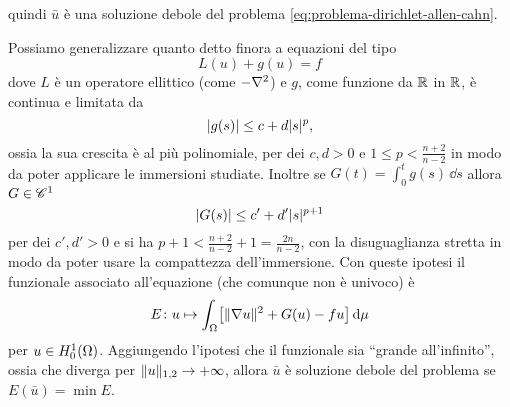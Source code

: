 quindi $\bar{u}$ è una soluzione debole del problema \eqref{eq:problema-dirichlet-allen-cahn}.

Possiamo generalizzare quanto detto finora a equazioni del tipo
\begin{equation}
    L(u)+g(u)=f
\end{equation}
dove $L$ è un operatore ellittico (come $-\lap$) e $g$, come funzione da $\R$ in $\R$, è continua e limitata da
\begin{equation}
    \abs{g(s)}\le c+d\abs{s}^p,
\end{equation}
ossia la sua crescita è al più polinomiale, per dei $c,d>0$ e $1\le p<\frac{n+2}{n-2}$ in modo da poter applicare le immersioni studiate.
Inoltre se $G(t)=\int_0^tg(s)\,\dd s$ allora $G\in\cclass[1]$
\begin{equation}
    \abs{G(s)}\le c'+d'\abs{s}^{p+1}
\end{equation}
per dei $c',d'>0$ e si ha $p+1<\frac{n+2}{n-2}+1=\frac{2n}{n-2}$, con la disuguaglianza stretta in modo da poter usare la compattezza dell'immersione.
Con queste ipotesi il funzionale associato all'equazione (che comunque non è univoco) è
\begin{equation}
    E\colon u\mapsto \int_\Omega\bigl[\norm{\grad u}^2+G(u)-fu\bigr]\,\dd\mu
\end{equation}
per $u\in\sobHc[1]{\Omega}$.
Aggiungendo l'ipotesi che il funzionale sia ``grande all'infinito'', ossia che diverga per $\norm{u}_{1,2}\to+\infty$, allora $\bar{u}$ è soluzione debole del problema se $E(\bar{u})=\min E$.

